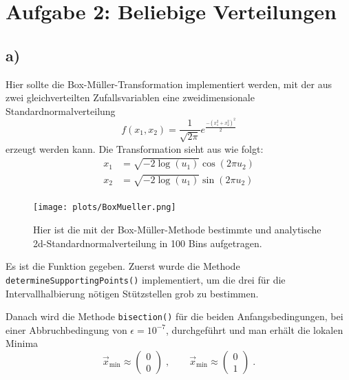\newpage
\section{Aufgabe 2: Beliebige Verteilungen}
\label{sec:auf2}

\subsection{a)}
    Hier sollte die Box-Müller-Transformation implementiert werden, mit der aus zwei gleichverteilten Zufallsvariablen eine zweidimensionale Standardnormalverteilung
    \begin{equation}
        f(x_1, x_2)  = \frac{1}{\sqrt{2 \pi}} e^{\frac{-(x_1^2 + x_2^2)^2}{2}}
    \end{equation}
    erzeugt werden kann.
    Die Transformation sieht aus wie folgt:
    \begin{align}
        x_1 &= \sqrt{-2 \log(u_1)} \cos(2 \pi u_2) \\
        x_2 &= \sqrt{-2 \log(u_1)} \sin(2 \pi u_2) \\
    \end{align}
    \begin{figure}[H]
        \centering
        \texttt{[image: plots/BoxMueller.png]} \vspace*{-0.5cm}
        \caption{Hier ist die mit der Box-Müller-Methode bestimmte und analytische 2d-Standardnormalverteilung in 100 Bins aufgetragen.}
        \label{fig:BoxMueller}
    \end{figure}
    \FloatBarrier

    Es ist die Funktion
    gegeben.
    Zuerst wurde die Methode \verb|determineSupportingPoints()| implementiert, um die drei für die Intervallhalbierung nötigen Stützstellen grob zu bestimmen.

    Danach wird die Methode \verb|bisection()| für die beiden Anfangsbedingungen, bei einer Abbruchbedingung von $\epsilon = 10^{-7}$, durchgeführt und man erhält die lokalen Minima
    \begin{equation}
        \vec{x}_{\mathrm{min}} \approx 
        \begin{pmatrix}
            0 \\ 0
        \end{pmatrix} \; , \qquad
        \vec{x}_{\mathrm{min}} \approx 
        \begin{pmatrix}
            0 \\ 1
        \end{pmatrix} \; .
    \end{equation}
    


